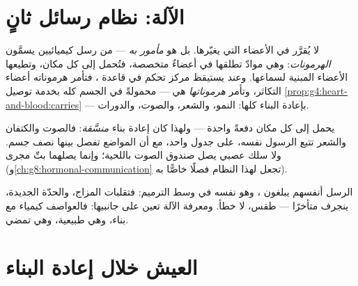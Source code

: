 \section{الآلة: نظام رسائل ثانٍ}

\begin{definition}\label{def:g8:puberty:hormones}
 لا يُقرَّر في الأعضاء التي يغيّرها. بل هو
\emph{مأمور به} --- من رسل كيميائيين يسمَّون
\emph{الهرمونات}: وهي موادّ تطلقها في
\emph{} أعضاءٌ متخصصة، فتُحمل إلى كل مكان، وتطيعها الأعضاء
المبنية لسماعها. وعند  يستيقظ مركز تحكم في قاعدة ،
فتأمر هرموناته أعضاء التكاثر، وتأمر \emph{هرموناتها} هي --- محمولةً
في الجسم كله بخدمة توصيل \cref{prop:g4:heart-and-blood:carries}
--- بإعادة البناء كلها: النمو، والشعر، والصوت، والدورات.
\end{definition}

\begin{example}\label{ex:g8:puberty:sites}
 يحمل  إلى كل مكان دفعةً واحدة --- ولهذا كان 
إعادة بناء \emph{منسَّقة}: فالصوت والكتفان والشعر تتبع الرسول نفسه،
على جدول واحد، مع أن المواضع تفصل بينها نصف جسم. ولا سلك عصبي يصل
صندوق الصوت باللحية؛ وإنما يصلهما بثّ مجرى 
(و\cref{ch:g8:hormonal-communication} تجعل لهذا النظام فصلًا خاصًّا
به).
\end{example}

\begin{remark}\label{rem:g8:puberty:moods}
الرسل أنفسهم يبلغون ، وهو نفسه في وسط الترميم: فتقلبات
المزاج، والحدّة الجديدة،  ينجرف متأخرًا --- طقس، لا خطأ.
ومعرفة الآلة تعين على جانبيها: فالعواصف كيمياء مع بناء، وهي طبيعية،
وهي تمضي.
\end{remark}

\section{العيش خلال إعادة البناء}

